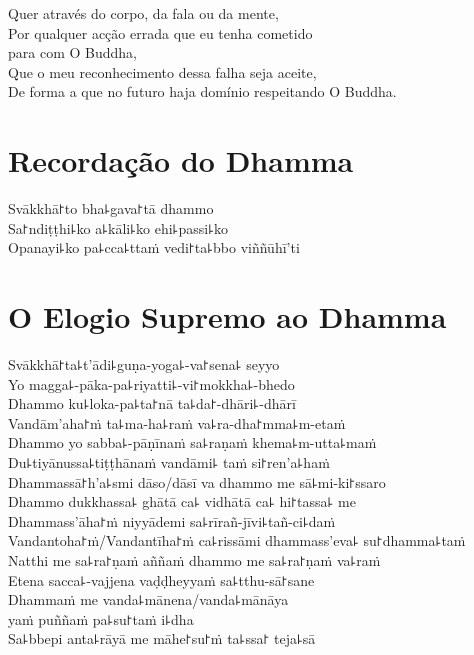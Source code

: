 Quer através do corpo, da fala ou da mente,\\
Por qualquer acção errada que eu tenha cometido\\
\vin para com O Buddha,\\
Que o meu reconhecimento dessa falha seja aceite,\\
De forma a que no futuro haja domínio respeitando O Buddha.

\clearpage

\chapter*{Recordação do Dhamma}

\delegateSetUseNext

\begin{leader}
\end{leader}

Svākkhā꜓to bha꜕gava꜓tā dhammo\\
Sa꜓ndiṭṭhi꜕ko a꜕kāli꜕ko ehi꜕passi꜕ko\\
Opanayi꜕ko pa꜕cca꜕ttaṁ vedi꜓ta꜕bbo viññūhī'ti

\chapter*{O Elogio Supremo ao Dhamma}

\begin{leader}
\end{leader}

Svākkhā꜓ta꜕t'ādi꜕guṇa-yoga꜕-va꜓sena꜕ seyyo\\
Yo magga꜕-pāka-pa꜕riyatti꜕-vi꜓mokkha꜕-bhedo\\
Dhammo ku꜕loka-pa꜕ta꜓nā ta꜕da꜓-dhāri꜕-dhārī\\
Vandām'aha꜓ṁ ta꜕ma-ha꜕raṁ va꜕ra-dha꜓mma꜕m-etaṁ\\
Dhammo yo sabba꜕-pāṇīnaṁ sa꜕raṇaṁ khema꜕m-utta꜕maṁ\\
Du꜕tiyānussa꜕tiṭṭhānaṁ vandāmi꜕ taṁ si꜓ren'a꜕haṁ\\
Dhammassā꜓h'a꜕smi dāso/dāsī va dhammo me sā꜕mi-ki꜓ssaro\\
Dhammo dukkhassa꜕ ghātā ca꜕ vidhātā ca꜕ hi꜓tassa꜕ me\\
Dhammass'āha꜓ṁ niyyādemi sa꜕rīrañ-jīvi꜕tañ-ci꜕daṁ\\
Vandantoha꜓ṁ/Vandantīha꜓ṁ ca꜕rissāmi dhammass'eva꜕ su꜓dhamma꜕taṁ\\
Natthi me sa꜕ra꜓ṇaṁ aññaṁ dhammo me sa꜕ra꜓ṇaṁ va꜕raṁ\\
Etena sacca꜕-vajjena vaḍḍheyyaṁ sa꜕tthu-sā꜓sane\\
Dhammaṁ me vanda꜕mānena/vanda꜕mānāya\\
\vin yaṁ puññaṁ pa꜕su꜓taṁ i꜕dha\\
Sa꜕bbepi anta꜕rāyā me māhe꜓su꜓ṁ ta꜕ssa꜓ teja꜕sā

